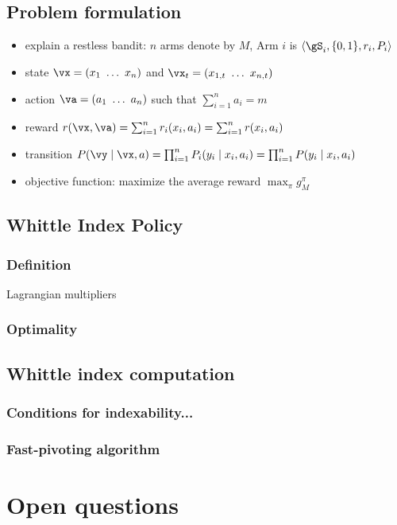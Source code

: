 \subsection{Problem formulation}
\label{subsec:restless_pb_formul}

\begin{itemize}
    \item explain a restless bandit: $n$ arms denote by $M$, Arm $i$ is $\langle\gS_i, \{0,1\}, r_i,P_i\rangle$
    \item state $\vx=(x_1\ \dots\ x_n)$ and $\vx_t=(x_{1,t}\ \dots\ x_{n,t})$
    \item action $\va=(a_1\ \dots\ a_n)$ such that $\sum_{i=1}^{n}a_i =m$
    \item reward $r(\vx, \va)=\sum_{i=1}^n r_i(x_i,a_i) =\sum_{i=1}^n r(x_i,a_i)$
    \item transition $P(\vy \mid\vx,a)=\prod_{i=1}^nP_i(y_i \mid x_i,a_i)=\prod_{i=1}^n P(y_i \mid x_i,a_i)$
    \item objective function: maximize the average reward $\max_{\pi}g^\pi_M$ 
\end{itemize}


\subsection{Whittle Index Policy}
\label{subsec:whittle_idx}

\subsubsection{Definition}

Lagrangian multipliers

\subsubsection{Optimality}

\subsection{Whittle index computation}

\subsubsection{Conditions for indexability...}

\subsubsection{Fast-pivoting algorithm}


\section{Open questions}

\endgroup
